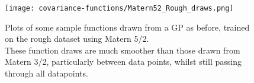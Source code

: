 \begin{figure}[H]
    \texttt{[image: covariance-functions/Matern52\_Rough\_draws.png]}
    \caption{
        Plots of some sample functions drawn from a GP as before, trained on the rough dataset using Matern 5/2. \\
        These function draws are much smoother than those drawn from Matern 3/2, particularly between data points, whilst still passing through all datapoints.
    }
\end{figure}





% 
% 
% 


% 
% 
% 
% 
% 
% 
% 
% 



